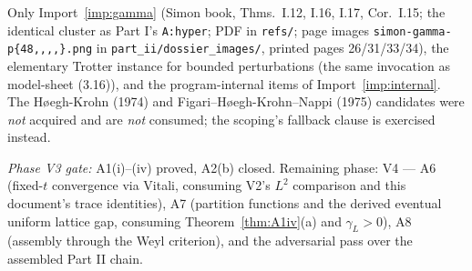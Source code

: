 \documentclass[11pt,a4paper]{article}
\theoremstyle{plain}
\theoremstyle{definition}
\begin{document}
Only Import~\ref{imp:gamma} (Simon book, Thms.\ I.12, I.16, I.17,
Cor.\ I.15; the identical cluster as Part I's \texttt{A:hyper}; PDF in
\texttt{refs/}; page images
\texttt{simon-gamma-p\{48,,,,\}.png} in \texttt{part\_ii/dossier\_images/}, printed
pages 26/31/33/34), the elementary Trotter instance for bounded
perturbations
(the same invocation as model-sheet (3.16)), and the program-internal
items of Import~\ref{imp:internal}. The H{\o}egh-Krohn (1974) and
Figari--H{\o}egh-Krohn--Nappi (1975) candidates were \emph{not}
acquired and are \emph{not} consumed; the scoping's fallback clause is
exercised instead.

\medskip
\noindent\emph{Phase V3 gate:} A1(i)--(iv) proved, A2(b) closed.
Remaining phase: V4 --- A6 (fixed-$t$ convergence via Vitali, consuming
V2's $L^2$ comparison and this document's trace identities), A7
(partition functions and the derived eventual uniform lattice gap,
consuming Theorem~\ref{thm:A1iv}(a) and $\gamma_L>0$), A8 (assembly
through the Weyl criterion), and the adversarial pass over the
assembled Part II chain.
\end{document}

